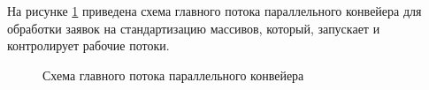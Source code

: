 На рисунке \ref{fig:parallel} приведена схема главного потока параллельного конвейера для обработки заявок на стандартизацию массивов, который, запускает и контролирует рабочие потоки.

\newpage
\begin{figure}[h!]
	
	
	\caption{Схема главного потока параллельного конвейера}
	
	\label{fig:parallel}
	
\end{figure}

